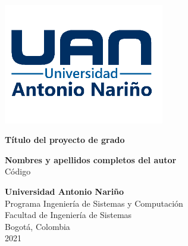 \begin{titlepage}
    \begin{center}
        \includegraphics[width=7cm]{images/uan.png}\\
        \vspace*{1cm}

        \Huge
        \textbf{Título del proyecto de grado}
 
        \vspace{2cm}
        
        \large
        \textbf{Nombres y apellidos completos del autor}\\
        Código
 
        \vfill
             
        \vspace{0.8cm}
             
        \textbf{Universidad Antonio Nariño}\\
        Programa Ingeniería de Sistemas y Computación\\
        Facultad de Ingeniería de Sistemas\\
        Bogotá, Colombia\\
        2021
    \end{center}
\end{titlepage}
